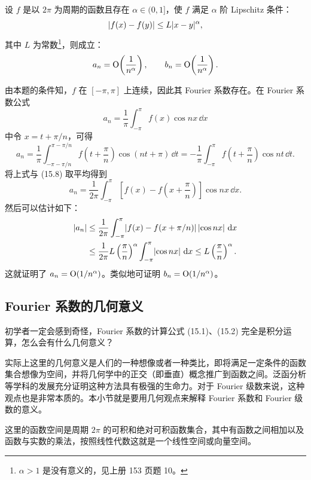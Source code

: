 \begin{xproposition}[15.1.5]
设 $f$ 是以 $2\pi$ 为周期的函数且存在 $\alpha\in(0,1]$，使 $f$ 满足 $\alpha$ 阶 Lipschitz 条件：
\[
  \lvert f(x)-f(y)\rvert\le L\lvert x-y\rvert^{\alpha},
\]
其中 $L$ 为常数\footnote{$\alpha>1$ 是没有意义的，见上册 153 页题 10。}，则成立：
\[
  a_n=\mathrm{O}\!\left(\frac1{n^{\alpha}}\right),\qquad
  b_n=\mathrm{O}\!\left(\frac1{n^{\alpha}}\right).
\]
\end{xproposition}

\begin{xproof}
由本题的条件知，$f$ 在 $[-\pi,\pi]$ 上连续，因此其 Fourier 系数存在。在 Fourier 系数公式
\begin{equation}
  a_n=\frac1\pi\int_{-\pi}^{\pi}f(x)\cos nx\,\dd x
  \tag{15.8}
  \label{eq:15.8}
\end{equation}
中令 $x=t+\pi/n$，可得
\[
  a_n=\frac1\pi\int_{-\pi-\pi/n}^{\pi-\pi/n}f\left(t+\frac\pi n\right)\cos(nt+\pi)\,\dd t
  =-\frac1\pi\int_{-\pi}^{\pi}f\left(t+\frac\pi n\right)\cos nt\,\dd t.
\]
将上式与 (15.8) 取平均得到
\[
  a_n=\frac1{2\pi}\int_{-\pi}^{\pi}\left[f(x)-f\left(x+\frac\pi n\right)\right]\cos nx\,\dd x.
\]
然后可以估计如下：
\begin{align*}
  \lvert a_n\rvert
  &\le \frac1{2\pi}\int_{-\pi}^{\pi}\lvert f(x)-f(x+\pi/n)\rvert\,\lvert\cos nx\rvert\,\mathop{}\!\mathrm{d} x\\
  &\le \frac1{2\pi}L\left(\frac\pi n\right)^{\alpha}\int_{-\pi}^{\pi}\lvert\cos nx\rvert\,\mathop{}\!\mathrm{d} x
  \le L\left(\frac\pi n\right)^{\alpha}.
\end{align*}
这就证明了 $a_n=\mathrm{O}(1/n^{\alpha})$。类似地可证明 $b_n=\mathrm{O}(1/n^{\alpha})$。
\end{xproof}

\subsection{Fourier 系数的几何意义}

初学者一定会感到奇怪，Fourier 系数的计算公式 (15.1)、(15.2) 完全是积分运算，怎么会有什么几何意义？

实际上这里的几何意义是人们的一种想像或者一种类比，即将满足一定条件的函数集合想像为空间，并将几何学中的正交（即垂直）概念推广到函数之间。泛函分析等学科的发展充分证明这种方法具有极强的生命力。对于 Fourier 级数来说，这种观点也是非常本质的。本小节就是要用几何观点来解释 Fourier 系数和 Fourier 级数的意义。

这里的函数空间是周期 $2\pi$ 的可积和绝对可积函数集合，其中有函数之间相加以及函数与实数的乘法，按照线性代数这就是一个线性空间或向量空间。

